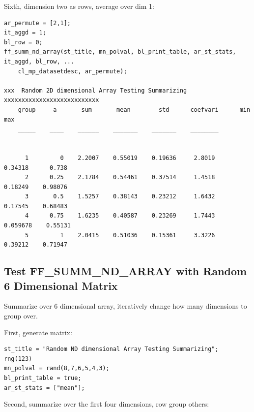 \documentclass[
]{book}
\begin{document}
Sixth, dimension two as rows, average over dim 1:

\begin{verbatim}
ar_permute = [2,1];
it_aggd = 1; 
bl_row = 0; 
ff_summ_nd_array(st_title, mn_polval, bl_print_table, ar_st_stats, it_aggd, bl_row, ...
    cl_mp_datasetdesc, ar_permute);

xxx  Random 2D dimensional Array Testing Summarizing  xxxxxxxxxxxxxxxxxxxxxxxxxxx
    group     a       sum       mean        std      coefvari      min         max  
    _____    ____    ______    _______    _______    ________    ________    _______

      1         0    2.2007    0.55019    0.19636     2.8019      0.34318      0.738
      2      0.25    2.1784    0.54461    0.37514     1.4518      0.18249    0.98076
      3       0.5    1.5257    0.38143    0.23212     1.6432      0.17545    0.68483
      4      0.75    1.6235    0.40587    0.23269     1.7443     0.059678    0.55131
      5         1    2.0415    0.51036    0.15361     3.3226      0.39212    0.71947
\end{verbatim}

\hypertarget{test-ff_summ_nd_array-with-random-6-dimensional-matrix}{%
\subsection{Test FF\_SUMM\_ND\_ARRAY with Random 6 Dimensional Matrix}\label{test-ff_summ_nd_array-with-random-6-dimensional-matrix}}

Summarize over 6 dimensional array, iteratively change how many
dimensions to group over.

First, generate matrix:

\begin{verbatim}
st_title = "Random ND dimensional Array Testing Summarizing";
rng(123)
mn_polval = rand(8,7,6,5,4,3);
bl_print_table = true;
ar_st_stats = ["mean"];
\end{verbatim}

Second, summarize over the first four dimensions, row group others:
\end{document}
